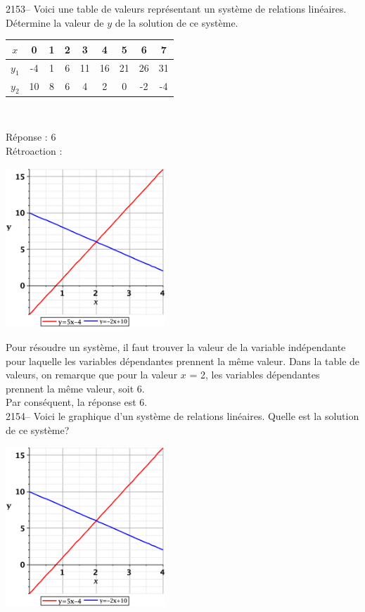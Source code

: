 \documentclass[letterpaper, 12pt]{article}
\begin{document}
2153-- Voici une table de valeurs repr\'esentant un syst\`eme de relations lin\'eaires. D\'etermine la valeur de $y$ de la solution de ce syst\`eme.
\begin{center}
 \begin{tabular}{|c||c| c | c | c | c | c | c | c |} \hline
{\bf $x$} & 0 & 1 & 2 & 3 & 4 & 5 & 6 & 7 \\ \hline
{\bf $y_{1}$} & -4 & 1 & 6 & 11 & 16 & 21 & 26 & 31 \\ \hline
{\bf $y_{2}$} & 10 & 8 & 6 & 4 & 2 & 0 & -2 & -4 \\ \hline
\end{tabular} \\[2mm]
\end{center}

R\'eponse : 6\\

R\'etroaction :
\begin{center}
 \includegraphics[width=6cm,bb=20 118 575 673]{Q2153.eps}
\end{center}
Pour r\'esoudre un syst\`eme, il faut trouver la valeur de la variable ind\'ependante pour laquelle les variables d\'ependantes prennent la m\^eme valeur. Dans la table de valeurs, on remarque que pour la valeur $x$ = 2, les variables d\'ependantes prennent la m\^eme valeur, soit 6.\\
Par cons\'equent, la r\'eponse est 6.\\

2154-- Voici le graphique d'un syst\`eme de relations lin\'eaires. Quelle est la solution de ce syst\`eme? \\
\begin{center}
 \includegraphics[width=6cm,bb=20 118 575 673]{Q2154.eps}
\end{center}
\end{document}
